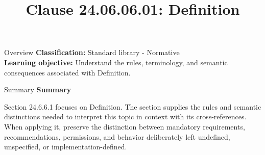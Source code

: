 \documentclass[10pt,letterpaper]{article}
\title{Clause 24.06.06.01: Definition}
\author{}
\date{}
\begin{document}
\maketitle
\begin{CornellOverviewBox}{Overview}
\textbf{Classification:} Standard library - Normative\\[2pt]
\textbf{Learning objective:} Understand the rules, terminology, and semantic consequences associated with Definition.
\end{CornellOverviewBox}\begin{CornellSummaryBox}{Summary}
{\sffamily\bfseries\color{Accent} Summary}\par\vspace{3pt}Section 24.6.6.1 focuses on Definition. The section supplies the rules and semantic distinctions needed to interpret this topic in context with its cross-references. When applying it, preserve the distinction between mandatory requirements, recommendations, permissions, and behavior deliberately left undefined, unspecified, or implementation-defined.
\end{CornellSummaryBox}
\end{document}
